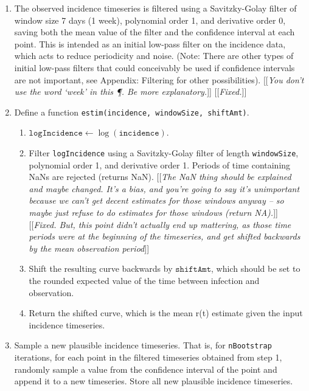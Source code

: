 \documentclass{article}
\newcommand{\code}[1]{\texttt{#1}}
\newcommand{\jd}[1]{[[\textsl{#1}]]} %
\newcommand{\msComment}[1]{[[\textsl{#1}]]}
\begin{document}
\begin{enumerate}
	\item The observed incidence timeseries is filtered using a Savitzky-Golay filter of window size 7 days (1 week), polynomial order 1, and derivative order 0, saving both the mean value of the filter and the confidence interval at each point. This is intended as an initial low-pass filter on the incidence data, which acts to reduce periodicity and noise. (Note: There are other types of initial low-pass filters that could conceivably be used if confidence intervals are not important, see Appendix: Filtering for other possibilities).
	\jd{You don't use the word `week' in this \P. Be more explanatory.} \msComment{Fixed.}
	
	\item Define a function \code{estim(incidence, windowSize, shiftAmt)}.
		\begin{enumerate}
			\item $\code{logIncidence} \gets \log(\code{incidence})$.
			\item Filter \code{logIncidence} using a Savitzky-Golay filter of length \code{windowSize}, polynomial order 1, and derivative order 1. Periods of time containing NaNs are rejected (returns NaN).
			\jd{The NaN thing should be explained and maybe changed. It's a bias, and you're going to say it's unimportant because we can't get decent estimates for those windows anyway -- so maybe just refuse to do estimates for those windows (return NA).} \msComment{Fixed. But, this point didn't actually end up mattering, as those time periods were at the beginning of the timeseries, and get shifted backwards by the mean observation period}
			
			\item Shift the resulting curve backwards by $\code{shiftAmt}$, which should be set to the rounded expected value of the time between infection and observation. 
			\item Return the shifted curve, which is the mean r(t) estimate given the input incidence timeseries. 
		\end{enumerate}
	
	\item Sample a new plausible incidence timeseries. That is, for \code{nBootstrap} iterations, for each point in the filtered timeseries obtained from step 1, randomly sample a value from the confidence interval of the point and append it to a new timeseries. Store all new plausible incidence timeseries.
	

\end{enumerate}
\end{document}

